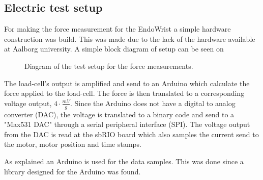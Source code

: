 \subsection*{Electric test setup}
For making the force measurement for the EndoWrist a simple hardware construction was build. This was made due to the lack of the hardware available at Aalborg university. A simple block diagram of setup can be seen on 

\begin{figure}[H]
\centering
{}
\caption{Diagram of the test setup for the force measurements.}
\label{fig:arduino_loadcell}
\end{figure}

The load-cell's output is amplified and send to an Arduino which calculate the force applied to the load-cell. The force is then translated to a corresponding voltage output, $4\cdot\frac{mV}{g}$. Since the Arduino does not have a digital to analog converter (DAC), the voltage is translated to a binary code and send to a "Max531 DAC" through a serial peripheral interface (SPI). The voltage output from the DAC is read at the sbRIO board which also samples the current send to the motor, motor position and time stamps.

As explained an Arduino is used for the data samples. This was done since a library designed for the Arduino was found.



